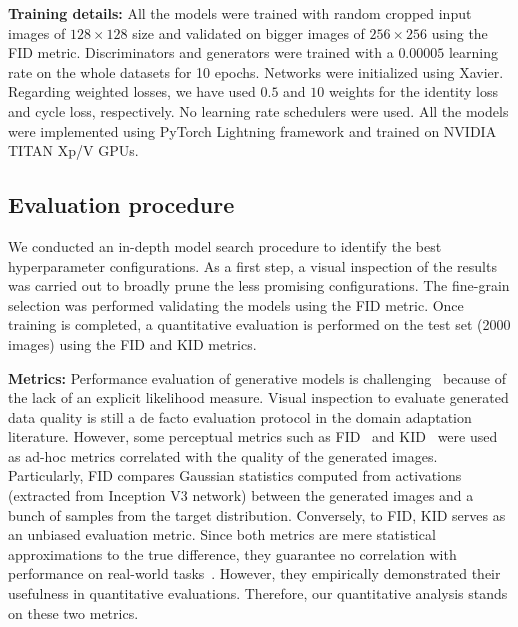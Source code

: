 \vspace*{0.1cm}\noindent\textbf{Training details:} All the models were trained with random cropped input images of $128\times128$ size and validated on bigger images of $256\times256$ using the \ac{FID} metric. Discriminators and generators were trained with a $0.00005$ learning rate on the whole datasets for 10 epochs. Networks were initialized using Xavier. Regarding weighted losses, we have used $0.5$ and $10$ weights for the identity loss and cycle loss, respectively. No learning rate schedulers were used. All the models were implemented using PyTorch Lightning framework and trained on NVIDIA TITAN Xp/V GPUs.

\subsection{Evaluation procedure}
We conducted an in-depth model search procedure to identify the best hyperparameter configurations. As a first step, a visual inspection of the results was carried out to broadly prune the less promising configurations. The fine-grain selection was performed validating the models using the \ac{FID} metric. Once training is completed, a quantitative evaluation is performed on the test set (2000 images) using the \ac{FID} and \ac{KID} metrics.

\vspace*{0.1cm}\noindent\textbf{Metrics:} Performance evaluation of generative models is challenging~\cite{Shmelkov2018,Xu2018} because of the lack of an explicit likelihood measure. Visual inspection to evaluate generated data quality is still a de facto evaluation protocol in the domain adaptation literature. However, some perceptual metrics such as \ac{FID}~\cite{Heusel2017} and \ac{KID}~\cite{Binkowski2018} were used as ad-hoc metrics correlated with the quality of the generated images. Particularly, \ac{FID} compares Gaussian statistics computed from activations (extracted from Inception V3 network) between the generated images and a bunch of samples from the target distribution. Conversely, to \ac{FID}, \ac{KID} serves as an unbiased evaluation metric. Since both metrics are mere statistical approximations to the true difference, they guarantee no correlation with performance on real-world tasks~\cite{Shmelkov2018}. However, they empirically demonstrated their usefulness in quantitative evaluations. Therefore, our quantitative analysis stands on these two metrics.

